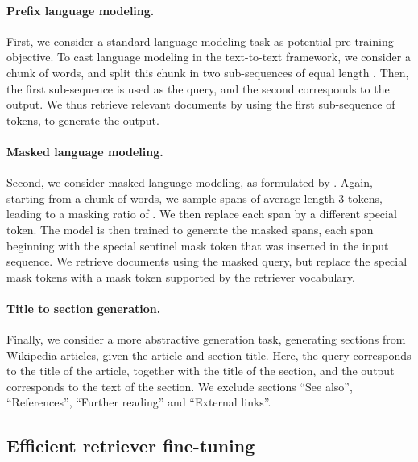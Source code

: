\documentclass[10pt]{article} \usepackage[preprint]{tmlr}
\begin{document}
\paragraph{Prefix language modeling.}
First, we consider a standard language modeling task as potential pre-training objective.
To cast language modeling in the text-to-text framework, we consider a chunk of  words, and split this chunk in two sub-sequences of equal length .
Then, the first sub-sequence is used as the query, and the second corresponds to the output.
We thus retrieve relevant documents by using the first sub-sequence of  tokens, to generate the output.

\paragraph{Masked language modeling.}
Second, we consider masked language modeling, as formulated by \citet{raffel2019exploring}.
Again, starting from a chunk of  words, we sample  spans of average length 3 tokens, leading to a masking ratio of .
We then replace each span by a different special token.
The model is then trained to generate the masked spans, each span beginning with the special sentinel mask token that was inserted in the input sequence.
We retrieve documents using the masked query, but replace the special mask tokens with a mask token supported by the retriever vocabulary.

\paragraph{Title to section generation.}
Finally, we consider a more abstractive generation task, generating sections from Wikipedia articles, given the article and section title.
Here, the query corresponds to the title of the article, together with the title of the section, and the output corresponds to the text of the section.
We exclude sections ``See also'', ``References'', ``Further reading'' and ``External links''.

\subsection{Efficient retriever fine-tuning}
\label{sec:efficient_finetuning}
\end{document}
